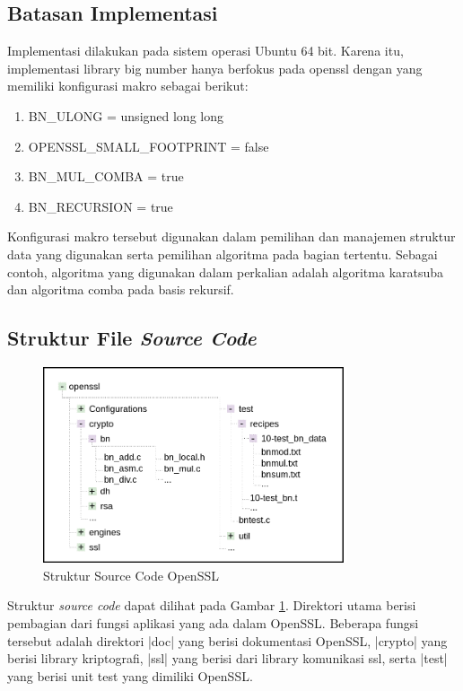 \subsection{Batasan Implementasi}
Implementasi dilakukan pada sistem operasi Ubuntu 64 bit. Karena itu, implementasi library big number hanya berfokus pada openssl dengan yang memiliki konfigurasi makro sebagai berikut:
\begin{enumerate}[label=\roman*.]
  \item BN\_ULONG = unsigned long long
  \item OPENSSL\_SMALL\_FOOTPRINT = false
  \item BN\_MUL\_COMBA = true
  \item BN\_RECURSION = true

\end{enumerate}

Konfigurasi makro tersebut digunakan dalam pemilihan dan manajemen struktur data yang digunakan serta pemilihan algoritma pada bagian tertentu. Sebagai contoh, algoritma yang digunakan dalam perkalian adalah algoritma karatsuba dan algoritma comba pada basis rekursif.


\subsection{Struktur File \textit{Source Code}}

\begin{figure}[h]
  \centering
  \includegraphics[width=0.8\textwidth]{resources/img/ch-4/file-tree.png}
  \caption{Struktur Source Code OpenSSL}
  \label{fig:ossl_file_structure}
\end{figure}

Struktur \textit{source code} dapat dilihat pada Gambar \ref{fig:ossl_file_structure}. Direktori utama berisi pembagian dari fungsi aplikasi yang ada dalam OpenSSL. Beberapa fungsi tersebut adalah direktori |doc| yang berisi dokumentasi OpenSSL, |crypto| yang berisi library kriptografi, |ssl| yang berisi dari library komunikasi ssl, serta |test| yang berisi unit test yang dimiliki OpenSSL.


